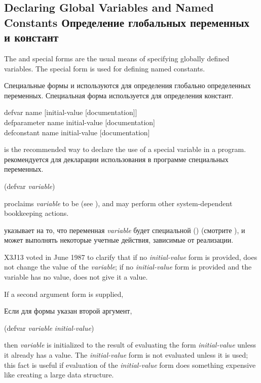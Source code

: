 \subsection{Declaring Global Variables and Named Constants Определение
  глобальных переменных и констант}

The  and  special forms are
the usual means of specifying globally defined variables.
The  special form is used for defining named constants.

Специальные формы  и  используются для определения
глобально определенных переменных.
Специальная форма  используется для определения констант.

\begin{defmac}
defvar name [initial-value [documentation]] \\
defparameter name initial-value [documentation] \\
defconstant name initial-value [documentation]

 is the recommended way to declare the use
of a special variable in a program.
 рекомендуется для декларации использования в программе специальных
переменных.
\begin{lisp}
(defvar \textit{variable})
\end{lisp}
proclaims \textit{variable} to be  (see ),
and may perform other system-dependent bookkeeping actions.

указывает на то, что переменная \textit{variable} будет специальной
() (смотрите ), и может выполнять некоторые учетные
действия, зависимые от реализации.

\begin{newer}
X3J13 voted in June 1987  to clarify
that if no \textit{initial-value} form is provided, 
does not change the value of the \textit{variable};
if no \textit{initial-value} form is provided and the variable
has no value,  does not give it a value.
\end{newer}
If a second argument form is supplied,

Если для формы указан второй аргумент,
\begin{lisp}
(defvar \textit{variable} \textit{initial-value})
\end{lisp}
then \textit{variable} is initialized to the result of evaluating the form
\textit{initial-value} unless it already has a value.  The \textit{initial-value} form
is not evaluated unless it is used; this fact is useful if
evaluation of the \textit{initial-value} form does something
expensive like creating a large data structure.


\end{defmac}
